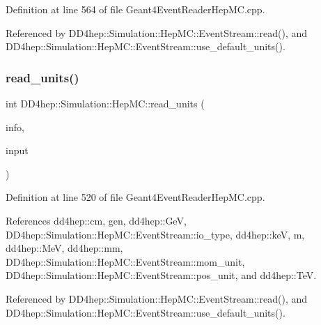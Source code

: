 Definition at line 564 of file Geant4\+Event\+Reader\+Hep\+M\+C.\+cpp.



Referenced by D\+D4hep\+::\+Simulation\+::\+Hep\+M\+C\+::\+Event\+Stream\+::read(), and D\+D4hep\+::\+Simulation\+::\+Hep\+M\+C\+::\+Event\+Stream\+::use\+\_\+default\+\_\+units().

\hypertarget{namespace_d_d4hep_1_1_simulation_1_1_hep_m_c_a35bd1c93d31d755bf0b911399c90c789}{}\label{namespace_d_d4hep_1_1_simulation_1_1_hep_m_c_a35bd1c93d31d755bf0b911399c90c789} 
\subsubsection{\texorpdfstring{read\+\_\+units()}{read\_units()}}
{\footnotesize\ttfamily int D\+D4hep\+::\+Simulation\+::\+Hep\+M\+C\+::read\+\_\+units (\begin{DoxyParamCaption}\item[{\hyperlink{class_d_d4hep_1_1_simulation_1_1_hep_m_c_1_1_event_stream}{Event\+Stream} \&}]{info,  }\item[{istringstream \&}]{input }\end{DoxyParamCaption})}



Definition at line 520 of file Geant4\+Event\+Reader\+Hep\+M\+C.\+cpp.



References dd4hep\+::cm, gen, dd4hep\+::\+GeV, D\+D4hep\+::\+Simulation\+::\+Hep\+M\+C\+::\+Event\+Stream\+::io\+\_\+type, dd4hep\+::keV, m, dd4hep\+::\+MeV, dd4hep\+::mm, D\+D4hep\+::\+Simulation\+::\+Hep\+M\+C\+::\+Event\+Stream\+::mom\+\_\+unit, D\+D4hep\+::\+Simulation\+::\+Hep\+M\+C\+::\+Event\+Stream\+::pos\+\_\+unit, and dd4hep\+::\+TeV.



Referenced by D\+D4hep\+::\+Simulation\+::\+Hep\+M\+C\+::\+Event\+Stream\+::read(), and D\+D4hep\+::\+Simulation\+::\+Hep\+M\+C\+::\+Event\+Stream\+::use\+\_\+default\+\_\+units().

\hypertarget{namespace_d_d4hep_1_1_simulation_1_1_hep_m_c_a433e938fb3dfef8ae2590fa16cdb2229}{}\label{namespace_d_d4hep_1_1_simulation_1_1_hep_m_c_a433e938fb3dfef8ae2590fa16cdb2229} 
